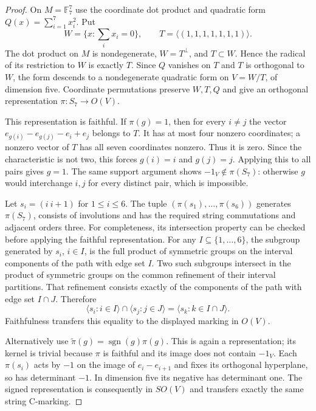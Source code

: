 \documentclass[11pt,a4paper]{article}
\begin{document}
\begin{proof}
On $M=\mathbb F_7^7$ use the coordinate dot product and quadratic form
$Q(x)=\sum_{i=1}^7x_i^2$. Put
\[
 W=\{x:\textstyle\sum_i x_i=0\},\qquad
 T=\langle(1,1,1,1,1,1,1)\rangle.
\]
The dot product on $M$ is nondegenerate, $W=T^\perp$, and
$T\subset W$. Hence the radical of its restriction to $W$ is exactly
$T$. Since $Q$ vanishes on $T$ and $T$ is orthogonal to $W$, the
form descends to a nondegenerate quadratic form on $V=W/T$, of
dimension five. Coordinate permutations preserve $W,T,Q$ and give
an orthogonal representation $\pi:S_7\longrightarrow O(V)$.

This representation is faithful. If $\pi(g)=1$, then for every
$i\ne j$ the vector
$e_{g(i)}-e_{g(j)}-e_i+e_j$ belongs to $T$. It has at most four
nonzero coordinates; a nonzero vector of $T$ has all seven coordinates
nonzero. Thus it is zero. Since the characteristic is not two, this
forces $g(i)=i$ and $g(j)=j$. Applying this to all pairs gives $g=1$.
The same support argument shows $-1_V\notin\pi(S_7)$: otherwise
$g$ would interchange $i,j$ for every distinct pair, which is impossible.

Let $s_i=(i\ i+1)$ for $1\le i\le6$. The tuple
$(\pi(s_1),\ldots,\pi(s_6))$ generates $\pi(S_7)$, consists of
involutions and has the required string commutations and adjacent
orders three. For completeness, its intersection property can be
checked before applying the faithful representation. For any
$I\subseteq\{1,\ldots,6\}$, the subgroup generated by $s_i$, $i\in I$,
is the full product of symmetric groups on the interval components
of the path with edge set $I$. Two such subgroups intersect in the
product of symmetric groups on the common refinement of their
interval partitions. That refinement consists exactly of the
components of the path with edge set $I\cap J$. Therefore
\[
 \langle s_i:i\in I\rangle\cap\langle s_j:j\in J\rangle
       =\langle s_k:k\in I\cap J\rangle.
\]
Faithfulness transfers this equality to the displayed marking in $O(V)$.

Alternatively use $\widetilde\pi(g)=\operatorname{sgn}(g)\pi(g)$.
This is again a representation; its kernel is trivial because $\pi$
is faithful and its image does not contain $-1_V$. Each $\pi(s_i)$
acts by $-1$ on the image of $e_i-e_{i+1}$ and fixes its orthogonal
hyperplane, so has determinant $-1$. In dimension five its negative
has determinant one. The signed representation is consequently in
$SO(V)$ and transfers exactly the same string C-marking.
\end{proof}
\end{document}
